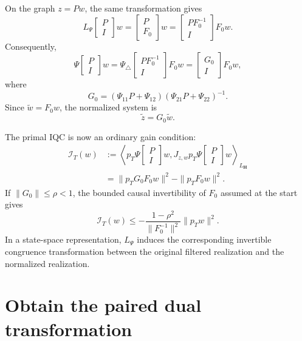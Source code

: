 \documentclass[11pt]{article}
\newcommand{\bmat}[1]{\begin{bmatrix}#1\end{bmatrix}}
\newcommand{\ip}[2]{\left\langle #1,#2\right\rangle}
\begin{document}
On the graph $z=Pw$, the same transformation gives
\begin{equation*}
 L_\Psi\bmat{P\\I}w
 =\bmat{P\\F_0}w
 =\bmat{PF_0^{-1}\\I}F_0w.
\end{equation*}
Consequently,
\begin{equation*}
 \Psi\bmat{P\\I}w
 =\Psi_\triangle\bmat{PF_0^{-1}\\I}F_0w
 =\bmat{G_0\\I}F_0w,
\end{equation*}
where
\begin{equation*}
 G_0=(\Psi_{11}P+\Psi_{12})
     (\Psi_{21}P+\Psi_{22})^{-1}.
\end{equation*}
Since $\tilde w=F_0w$, the normalized system is
\setcounter{equation}{20}
\begin{equation}
 \widetilde z=G_0\widetilde w.
 \label{eq:normalized-system}
\end{equation}

The primal IQC is now an ordinary gain condition:
\begin{align*}
 \mathcal I_T(w)
 &:=
 \ip{p_T\Psi\bmat{P\\I}w}
 {J_{z,w}p_T\Psi\bmat{P\\I}w}_{L_\mathbf H}\\
 &=\|p_TG_0F_0w\|^2
   -\|p_TF_0w\|^2.
\end{align*}
If $\|G_0\|\leq\rho<1$, the bounded causal invertibility of $F_0$ assumed at
the start gives
\begin{equation*}
 \mathcal I_T(w)
 \leq-\frac{1-\rho^2}{\|F_0^{-1}\|^2}
       \|p_Tw\|^2.
\end{equation*}
In a state-space representation, $L_\Psi$ induces the corresponding
invertible congruence transformation between the original filtered
realization and the normalized realization.

\section*{Obtain the paired dual transformation}
\end{document}
